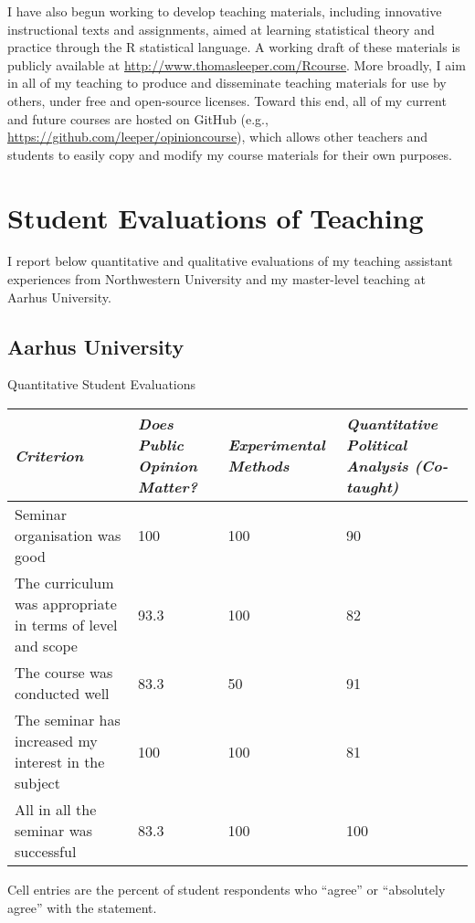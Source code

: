 \documentclass[12pt]{article}
\begin{document}
I have also begun working to develop teaching materials, including innovative instructional texts and assignments, aimed at learning statistical theory and practice through the R statistical language. A working draft of these materials is publicly available at \url{http://www.thomasleeper.com/Rcourse}. More broadly, I aim in all of my teaching to produce and disseminate teaching materials for use by others, under free and open-source licenses. Toward this end, all of my current and future courses are hosted on GitHub (e.g., \url{https://github.com/leeper/opinioncourse}), which allows other teachers and students to easily copy and modify my course materials for their own purposes.

\clearpage

\section{Student Evaluations of Teaching}

I report below quantitative and qualitative evaluations of my teaching assistant experiences from Northwestern University and my master-level teaching at Aarhus University.

\subsection{Aarhus University}

\begin{center}
	Quantitative Student Evaluations 
	\begin{tabular}{p{3in} p{1.1in} p{1.1in} p{1.1in}}\toprule
		\emph{Criterion}	
		&\emph{Does Public Opinion Matter?}	
		&\emph{Experimental Methods}
		&\emph{Quantitative Political Analysis (Co-taught)}
		\\ \midrule
		Seminar organisation was good & 100 & 100 & 90\\
		The curriculum was appropriate in terms of level and scope & 93.3 & 100 & 82\\
		The course was conducted well & 83.3 & 50 & 91\\
		The seminar has increased my interest in the subject & 100 & 100 & 81\\
		All in all the seminar was successful & 83.3 & 100 & 100\\
		\bottomrule
	\end{tabular}
\end{center}
Cell entries are the percent of student respondents who ``agree'' or ``absolutely agree'' with the statement.
\end{document}
